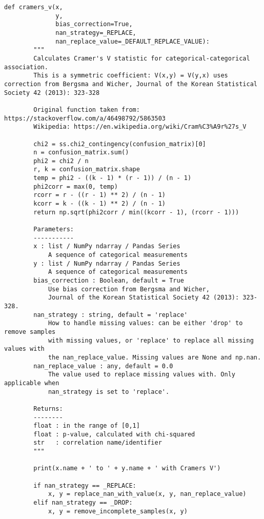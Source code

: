 \begin{lstlisting}[basicstyle=\tiny, style=py, caption={Compute Correlation Function}, label=lst:compute_correlation]
    def cramers_v(x,
              y,
              bias_correction=True,
              nan_strategy=_REPLACE,
              nan_replace_value=_DEFAULT_REPLACE_VALUE):
        """
        Calculates Cramer's V statistic for categorical-categorical association.
        This is a symmetric coefficient: V(x,y) = V(y,x) uses correction from Bergsma and Wicher, Journal of the Korean Statistical Society 42 (2013): 323-328

        Original function taken from: https://stackoverflow.com/a/46498792/5863503
        Wikipedia: https://en.wikipedia.org/wiki/Cram%C3%A9r%27s_V

        chi2 = ss.chi2_contingency(confusion_matrix)[0]
        n = confusion_matrix.sum()
        phi2 = chi2 / n
        r, k = confusion_matrix.shape
        temp = phi2 - ((k - 1) * (r - 1)) / (n - 1)
        phi2corr = max(0, temp)
        rcorr = r - ((r - 1) ** 2) / (n - 1)
        kcorr = k - ((k - 1) ** 2) / (n - 1)
        return np.sqrt(phi2corr / min((kcorr - 1), (rcorr - 1)))

        Parameters:
        -----------
        x : list / NumPy ndarray / Pandas Series
            A sequence of categorical measurements
        y : list / NumPy ndarray / Pandas Series
            A sequence of categorical measurements
        bias_correction : Boolean, default = True
            Use bias correction from Bergsma and Wicher,
            Journal of the Korean Statistical Society 42 (2013): 323-328.
        nan_strategy : string, default = 'replace'
            How to handle missing values: can be either 'drop' to remove samples
            with missing values, or 'replace' to replace all missing values with
            the nan_replace_value. Missing values are None and np.nan.
        nan_replace_value : any, default = 0.0
            The value used to replace missing values with. Only applicable when
            nan_strategy is set to 'replace'.

        Returns:
        --------
        float : in the range of [0,1]
        float : p-value, calculated with chi-squared
        str   : correlation name/identifier
        """

        print(x.name + ' to ' + y.name + ' with Cramers V')

        if nan_strategy == _REPLACE:
            x, y = replace_nan_with_value(x, y, nan_replace_value)
        elif nan_strategy == _DROP:
            x, y = remove_incomplete_samples(x, y)


\end{lstlisting}
